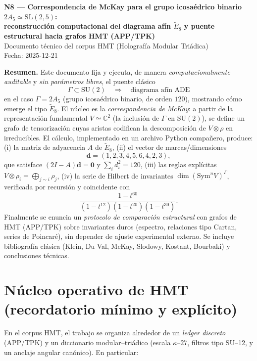 \documentclass[11pt,a4paper]{article}
\theoremstyle{definition}
\theoremstyle{remark}
\begin{document}
\begin{center}
{\Large\bfseries N8 — Correspondencia de McKay para el grupo icosaédrico binario $2A_5\simeq \mathrm{SL}(2,5)$:\\
reconstrucción computacional del diagrama afín $\widetilde{E}_8$ y puente estructural hacia grafos HMT (APP/TPK)}\\[0.6em]
{\normalsize Documento técnico del corpus HMT (Holografía Modular Triádica)}\\
{\normalsize Fecha: 2025-12-21}
\end{center}

\vspace{0.5em}

\textbf{Resumen.}
Este documento fija y ejecuta, de manera \emph{computacionalmente auditable} y \emph{sin parámetros libres}, el puente clásico
\[
\Gamma \subset \mathrm{SU}(2) \quad\Longrightarrow\quad \text{diagrama afín ADE}
\]
en el caso $\Gamma=2A_5$ (grupo icosaédrico binario, de orden $120$), mostrando cómo emerge el tipo $\widetilde{E}_8$.
El núcleo es la \emph{correspondencia de McKay}: a partir de la representación fundamental $V\simeq\mathbb C^2$ (la inclusión de $\Gamma$ en $\mathrm{SU}(2)$),
se define un grafo de tensorización cuyas aristas codifican la descomposición de $V\otimes\rho$ en irreducibles.
El cálculo, implementado en un archivo Python compañero, produce:
(i) la matriz de adyacencia $A$ de $\widetilde{E}_8$, (ii) el vector de marcas/dimensiones
\[
\bm d=(1,2,3,4,5,6,4,2,3),
\]
que satisface $(2I-A)\bm d=\bm 0$ y $\sum_i d_i^2=120$, (iii) las reglas explícitas $V\otimes\rho_i=\bigoplus_{j\sim i}\rho_j$,
(iv) la serie de Hilbert de invariantes $\dim(\mathrm{Sym}^nV)^\Gamma$, verificada por recursión y coincidente con
\[
\frac{1-t^{60}}{(1-t^{12})(1-t^{20})(1-t^{30})}.
\]
Finalmente se enuncia un \emph{protocolo de comparación estructural} con grafos de HMT (APP/TPK) sobre invariantes duros (espectro, relaciones tipo Cartan, series de Poincaré),
sin depender de ajuste experimental externo. Se incluye bibliografía clásica (Klein, Du Val, McKay, Slodowy, Kostant, Bourbaki) y conclusiones técnicas.

\tableofcontents

\section{Núcleo operativo de HMT (recordatorio mínimo y explícito)}
En el corpus HMT, el trabajo se organiza alrededor de un \emph{ledger discreto} (APP/TPK) y un diccionario modular--triádico
(escala $\kappa$--$27$, filtros tipo SU--12, y un anclaje angular canónico). En particular:
\end{document}
